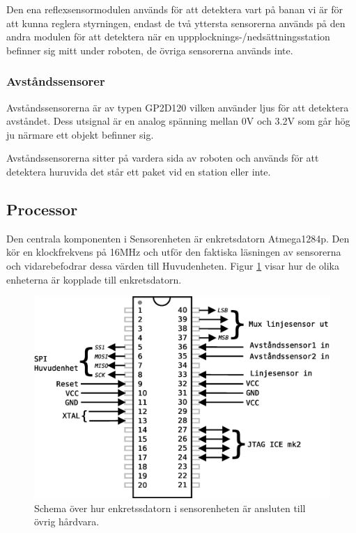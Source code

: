 Den ena reflexsensormodulen används för att detektera vart på banan vi är för att kunna reglera styrningen, endast de två yttersta sensorerna används på den andra modulen för att detektera när en uppplocknings-/nedsättningsstation befinner sig mitt under roboten, de övriga sensorerna används inte.

\subsubsection{Avståndssensorer}
Avståndssensorerna är av typen GP2D120 vilken använder ljus för att detektera avståndet. Dess utsignal är en analog spänning mellan 0V och 3.2V som går hög ju närmare ett objekt befinner sig. 

Avståndssensorerna sitter på vardera sida av roboten och används för att detektera huruvida det står ett paket vid en station eller inte.

\subsection{Processor}
Den centrala komponenten i Sensorenheten är enkretsdatorn Atmega1284p. Den kör en klockfrekvens på 16MHz och utför den faktiska läsningen av sensorerna och vidarebefodrar dessa värden till Huvudenheten. Figur \ref{sensor-processor} visar hur de olika enheterna är kopplade till enkretsdatorn.

\begin{figure}[h!]
	\centering
	\includegraphics[scale=0.5]{grafik/sensorenhet-processor}
	\caption{Schema över hur enkretssdatorn i sensorenheten är ansluten till övrig hårdvara.} \label{sensor-processor}
\end{figure}

